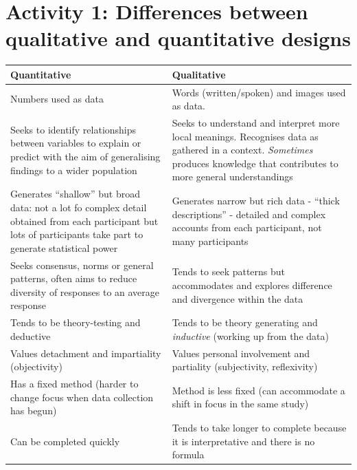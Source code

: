 \documentclass[
  english,
  letterpaper,
  DIV=11,
  numbers=noendperiod]{scrreprt}
\begin{document}
\section{Activity 1: Differences between qualitative and quantitative
designs}\label{activity-1-differences-between-qualitative-and-quantitative-designs}

\begin{longtable}[]{@{}
  >{\raggedright\arraybackslash}p{}
  >{\raggedright\arraybackslash}p{}@{}}
\toprule\noalign{}
\begin{minipage}[b]{\linewidth}\raggedright
Quantitative
\end{minipage} & \begin{minipage}[b]{\linewidth}\raggedright
Qualitative
\end{minipage} \\
\midrule\noalign{}
\endhead
\bottomrule\noalign{}
\endlastfoot
Numbers used as data & Words (written/spoken) and images used as
data. \\
Seeks to identify relationships between variables to explain or predict
with the aim of generalising findings to a wider population & Seeks to
understand and interpret more local meanings. Recognises data as
gathered in a context. \emph{Sometimes} produces knowledge that
contributes to more general understandings \\
Generates ``shallow'' but broad data: not a lot fo complex detail
obtained from each participant but lots of participants take part to
generate statistical power & Generates narrow but rich data - ``thick
descriptions'' - detailed and complex accounts from each participant,
not many participants \\
Seeks consensus, norms or general patterns, often aims to reduce
diversity of responses to an average response & Tends to seek patterns
but accommodates and explores difference and divergence within the
data \\
Tends to be theory-testing and deductive & Tends to be theory generating
and \emph{inductive} (working up from the data) \\
Values detachment and impartiality (objectivity) & Values personal
involvement and partiality (subjectivity, reflexivity) \\
Has a fixed method (harder to change focus when data collection has
begun) & Method is less fixed (can accommodate a shift in focus in the
same study) \\
Can be completed quickly & Tends to take longer to complete because it
is interpretative and there is no formula \\
\end{longtable}
\end{document}
